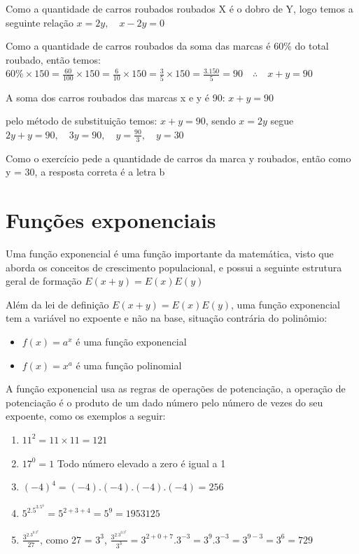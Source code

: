 \begin{multicols*}{2}
    Como a quantidade de carros roubados roubados X é o dobro de Y, logo temos a seguinte relação
    $x = 2y, \quad x - 2y = 0$

    Como a quantidade de carros roubados da soma das marcas é 60\% do total roubado, então temos:
    $60\% \times 150 = \frac{60}{100} \times 150 = \frac{6}{10} \times 150 =
        \frac{3}{5} \times 150  = \frac{3.150}{5} = 90 \quad \therefore \quad x+y = 90$

    A soma dos carros roubados das marcas x e y é 90: $x+y = 90$

    pelo método de substituição temos: $x+y = 90$, sendo $x = 2y$ segue $2y + y = 90, \quad
        3y = 90, \quad y = \frac{90}{3}, \quad y = 30$

    Como o exercício pede a quantidade de carros da marca y roubados, então como y = 30, a resposta 		correta é a letra b

    \section*{Funções exponenciais}

    Uma função exponencial é uma função importante da matemática, visto que aborda os conceitos de 			crescimento populacional, e possui a seguinte estrutura geral de formação $E(x+y) = E(x)E(y)$

    Além da lei de definição $E(x+y) = E(x)E(y)$, uma função exponencial tem a variável no expoente 		e não na base, situação contrária do polinômio:
    \begin{itemize}

        \item $f(x) = a^{x}$ é uma função exponencial

        \item $f(x) = x^a$ é uma função polinomial

    \end{itemize}

    A função exponencial usa as regras de operações de potenciação, a operação de potenciação é o 			produto de um dado número pelo número de vezes do seu expoente, como os exemplos a seguir:

    \begin{enumerate}
        \item $11^2 = 11 \times 11 = 121$
        \item $17^0 = 1$ Todo número elevado a zero é igual a 1
        \item $(-4)^4 = (-4).(-4).(-4).(-4) = 256$
        \item $5^2.5^3.5^4 = 5^{2+3+4} = 5^{9} = 1953125$
        \item $\frac{3^2.3^0.3^7}{27}$, como 27 = $3^3$, $\frac{3^2.3^0.3^7}{3^3} = 3^{2+0+7}.3^{-3}
                      = 3^{9}.3^{-3} = 3^{9-3} = 3^{6} = 729$
    \end{enumerate}


\end{multicols*}
